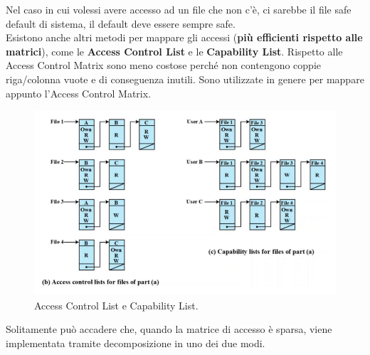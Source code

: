\noindent Nel caso in cui volessi avere accesso ad un file che non c’è, ci
sarebbe il file safe default di sistema, il default deve essere sempre safe. \\
Esistono anche altri metodi per mappare gli accessi (\textbf{più efficienti
      rispetto alle matrici}), come le \textbf{Access Control List} e le \textbf{Capability
      List}. Rispetto alle Access Control Matrix sono meno costose perché non
contengono coppie riga/colonna vuote e di conseguenza inutili. Sono utilizzate
in genere per mappare appunto l’Access Control Matrix.

\begin{figure}[H]
      \centering
      \includegraphics[width=12cm, keepaspectratio]{capitoli/policy/imgs/matrix_access_control2.png}
      \caption{ Access Control List e Capability List.}
\end{figure}
\noindent Solitamente può accadere che, quando la matrice di accesso è sparsa,
viene implementata tramite decomposizione in uno dei due modi.\\

